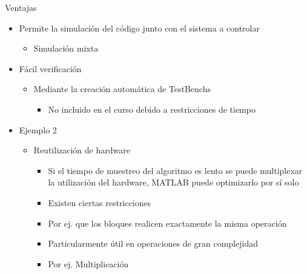 \documentclass{beamer}
\begin{document}
\begin{frame}{Ventajas}
\begin{itemize}
	\item Permite la simulación del código junto con el sistema a controlar
	\begin{itemize}
		\item Simulación mixta
	\end{itemize}
	\item Fácil verificación
	\begin{itemize}
		\item Mediante la creación automática de TestBenchs
		\begin{itemize}
			\item No incluido en el curso debido a restricciones de tiempo
		\end{itemize}
	\end{itemize}
	\item Ejemplo 2
	\begin{itemize}
		\item Reutilización de hardware
		\begin{itemize}
			\item Si el tiempo de muestreo del algoritmo es lento se puede multiplexar la utilización del hardware, MATLAB puede optimizarlo por sí solo
			\item Existen ciertas restricciones
			\item Por ej. que los bloques realicen exactamente la misma operación
			\item Particularmente útil en operaciones de gran complejidad
			\item Por ej. Multiplicación
		\end{itemize}
	\end{itemize}
\end{itemize}
\end{frame}
\end{document}
